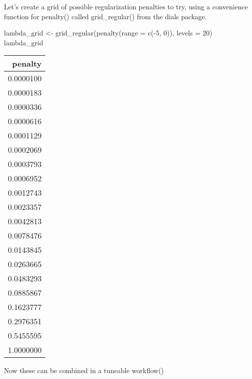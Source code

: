 \documentclass[
]{article}
\newenvironment{Shaded}{}{}
\newcommand{\AttributeTok}[1]{\textcolor[rgb]{0.49,0.56,0.16}{#1}}
\newcommand{\DecValTok}[1]{\textcolor[rgb]{0.25,0.63,0.44}{#1}}
\newcommand{\FunctionTok}[1]{\textcolor[rgb]{0.02,0.16,0.49}{#1}}
\newcommand{\NormalTok}[1]{#1}
\newcommand{\OtherTok}[1]{\textcolor[rgb]{0.00,0.44,0.13}{#1}}
\newcommand{\SpecialCharTok}[1]{\textcolor[rgb]{0.25,0.44,0.63}{#1}}
\begin{document}
Let's create a grid of possible regularization penalties to try, using a
convenience function for penalty() called grid\_regular() from the dials
package.

\begin{Shaded}
\begin{Highlighting}[]
\NormalTok{lambda\_grid }\OtherTok{\textless{}{-}} \FunctionTok{grid\_regular}\NormalTok{(}\FunctionTok{penalty}\NormalTok{(}\AttributeTok{range =} \FunctionTok{c}\NormalTok{(}\SpecialCharTok{{-}}\DecValTok{5}\NormalTok{, }\DecValTok{0}\NormalTok{)), }\AttributeTok{levels =} \DecValTok{20}\NormalTok{)}
\NormalTok{lambda\_grid}
\end{Highlighting}
\end{Shaded}

\begin{tabular}{r}
\hline
penalty\\
\hline
0.0000100\\
\hline
0.0000183\\
\hline
0.0000336\\
\hline
0.0000616\\
\hline
0.0001129\\
\hline
0.0002069\\
\hline
0.0003793\\
\hline
0.0006952\\
\hline
0.0012743\\
\hline
0.0023357\\
\hline
0.0042813\\
\hline
0.0078476\\
\hline
0.0143845\\
\hline
0.0263665\\
\hline
0.0483293\\
\hline
0.0885867\\
\hline
0.1623777\\
\hline
0.2976351\\
\hline
0.5455595\\
\hline
1.0000000\\
\hline
\end{tabular}

Now these can be combined in a tuneable workflow()
\end{document}
